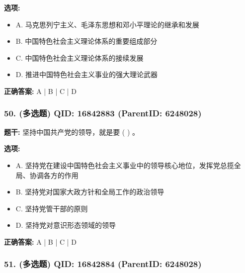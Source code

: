 \documentclass[12pt,UTF8]{ctexart}
\begin{document}
\textbf{选项:}
\begin{itemize}[leftmargin=*]

  \item A. 马克思列宁主义、毛泽东思想和邓小平理论的继承和发展

  \item B. 中国特色社会主义理论体系的重要组成部分

  \item C. 中国特色社会主义理论体系的接续发展

  \item D. 推进中国特色社会主义事业的强大理论武器

\end{itemize}

\textbf{正确答案:}
A | B | C | D

\vspace{0.3em}\hrulefill\vspace{0.7em}

\subsubsection*{50. (多选题) \small QID: 16842883 (ParentID: 6248028)}

\textbf{题干:}
坚持中国共产党的领导，就是要 ( ) 。



\textbf{选项:}
\begin{itemize}[leftmargin=*]

  \item A. 坚持党在建设中国特色社会主义事业中的领导核心地位，发挥党总揽全局、协调各方的作用

  \item B. 坚持党对国家大政方针和全局工作的政治领导

  \item C. 坚持党管干部的原则

  \item D. 坚持党对意识形态领域的领导

\end{itemize}

\textbf{正确答案:}
A | B | C | D

\vspace{0.3em}\hrulefill\vspace{0.7em}

\subsubsection*{51. (多选题) \small QID: 16842884 (ParentID: 6248028)}
\end{document}

